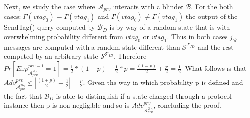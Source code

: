     Next, we study the case where $\mathcal{A}_{prv}$ interacts with a blinder $\mathcal{B}$. For the both cases: $\Gamma(vtag_0) = \Gamma(vtag_1)$ and 
    $\Gamma(vtag_0) \neq \Gamma(vtag_1)$ the output of the SendTag() query computed by $\mathcal{B}_D$ is by way of a random state that is
    with overwhelming probability different from $vtag_0$ or $vtag_1$. Thus in both cases $j_\mathcal{R}$ messages are computed with a random 
    state different than $\mathcal{S}^{\mathcal{T}_{ID}}$ and the rest computed by an arbitrary state $\mathcal{S}^{\mathcal{T}_{ID}}$. Therefore 
    $Pr[Exp_{\mathcal{A}_{prv}^{\mathcal{B}_D}}^{prv-1} = 1] = \frac{1}{2}*(1-p)+\frac{1}{2}*p = \frac{(1-p)}{2}+\frac{p}{2} = \frac{1}{2}.$
    What follows is that $Adv_{\mathcal{A}_{prv}^{\mathcal{B}_D}}^{prv} \leq | \frac{(1+p)}{2} - \frac{1}{2} | = \frac{p}{2}$. Given the way in 
    which probability p is defined and the fact that $\mathcal{B}_D$ is able to distinguish if a state changed through a protocol instance then
    p is non-negligible and so is $Adv_{\mathcal{A}_{prv}^{\mathcal{B}_D}}^{prv}$, concluding the proof. 
    
